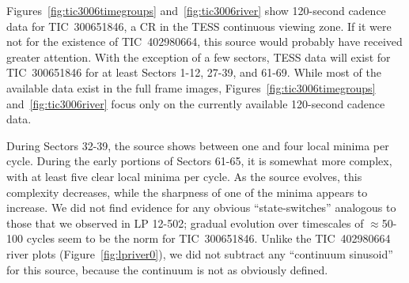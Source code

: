 \documentclass[11pt,twocolumn,tighten]{aastex63}
\begin{document}
Figures~\ref{fig:tic3006timegroups} and~\ref{fig:tic3006river} show
120-second cadence data for TIC~300651846, a CR in the TESS
continuous viewing zone.  If it were not for the existence of
TIC~402980664, this source would probably have received greater
attention.  With the exception of a few sectors, TESS data will exist
for TIC~300651846 for at least Sectors 1-12, 27-39, and 61-69.  While
most of the available data exist in the full frame images,
Figures~\ref{fig:tic3006timegroups} and~\ref{fig:tic3006river} focus
only on the currently available 120-second cadence data.

During Sectors 32-39, the source shows between one and four local
minima per cycle.  During the early portions of Sectors 61-65, it is
somewhat more complex, with at least five clear local minima per
cycle.  As the source evolves, this complexity decreases, while the
sharpness of one of the minima appears to increase.  We did not find
evidence for any obvious ``state-switches'' analogous to those that we
observed in LP 12-502; gradual evolution over timescales of
$\approx$50-100 cycles seem to be the norm for TIC~300651846.  Unlike
the TIC~402980664 river plots (Figure~\ref{fig:lpriver0}), we did not
subtract any ``continuum sinusoid'' for this source, because the
continuum is not as obviously defined.

\begin{figure*}[!t]
	\begin{center}
	\end{center}
	\vspace{-0.4cm}
	\caption{
		{\bf Light curve evolution of TIC 300651846}.
    All available 120-second cadence data as of 2023 Aug 11 are shown.
    Cycles 0 to 622 span TESS Sectors 32-39 (Nov 2020--June 2021);
    cycles 2296-2676 span Sectors 61-65 (Jan--June 2023).  We assumed
    a 8.254\,hr period and a fixed reference epoch (BTJD 2174.127) for
    both panels.  Light curve segments are split based on the presence
    of gaps longer than three hours.  Cycle numbers are listed in the
    lower-right of each light curve segment.
	}
	\label{fig:tic3006timegroups}
\end{figure*}


\begin{figure*}[!t]
	\begin{center}
	\end{center}
	\vspace{-0.4cm}
	\caption{
		{\bf River plots of TIC 300651846}.
    This is an alternative visualization of the data in
    Figure~\ref{fig:tic3006timegroups}.  All available 120-second
    cadence data as of 2023 Aug 11 are shown.  Cycles 0 to 622 span
    TESS Sectors 32-39 (Nov 2020--June 2021); cycles 2296-2676 span
    Sectors 61-65 (Jan--June 2023).  We assumed $P$$=$8.254\,hr and
    $t_0$=2174.127 [BTJD].  Note that the two panels have slightly
    different color scales.
	}
	\label{fig:tic3006river}
\end{figure*}
\end{document}

